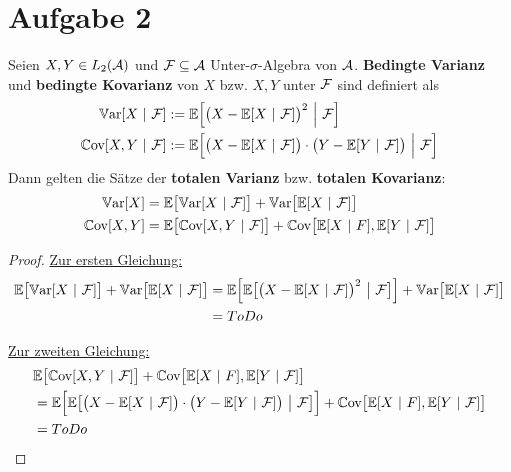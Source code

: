 \documentclass[12pt,a4paper]{article}
\begin{document}
\section*{Aufgabe 2}
Seien $X,Y\in L_2(\A)$ und $\F\subseteq\A$ Unter-$\sigma$-Algebra von $\A$. \textbf{Bedingte Varianz} und \textbf{bedingte Kovarianz} von $X$ bzw. $X,Y$ unter $\F$ sind definiert als
\begin{align*}
\Var[X~|~\F]&:=\E\Big[\big(X-\E[X~|~\F]\big)^2~\Big|~\F\Big]\\
\Cov[X,Y~|~\F]&:=\E\Big[\big(X-\E[X~|~\F]\big)\cdot\big(Y-\E[Y~|~\F]\big)~\Big|~\F\Big]
\end{align*}
Dann gelten die Sätze der \textbf{totalen Varianz} bzw. \textbf{totalen Kovarianz}:
\begin{align*}
\Var[X]&=\E\big[\Var[X~|~\F]\big]+\Var\big[\E[X~|~\F]\big]\\
\Cov[X,Y]&=\E\big[\Cov[X,Y~|~\F]\big]+\Cov\big[\E[X~|~F],\E[Y~|~\F]\big]
\end{align*}
\begin{proof}
\underline{Zur ersten Gleichung:}
\begin{align*}
\E\big[\Var[X~|~\F]\big]+\Var\big[\E[X~|~\F]\big]
&=\E\Big[\E\big[\big(X-\E[X~|~\F]\big)^2~\big|~\F\big]\Big]+\Var\big[\E[X~|~\F]\big]\\
&=ToDo
\end{align*}

\underline{Zur zweiten Gleichung:}
\begin{align*}
&\E\big[\Cov[X,Y~|~\F]\big]+\Cov\big[\E[X~|~F],\E[Y~|~\F]\big]\\
&=\E\Big[\E\big[\big(X-\E[X~|~\F]\big)\cdot\big(Y-\E[Y~|~\F]\big)~\big|~\F\big]\Big]+\Cov\big[\E[X~|~F],\E[Y~|~\F]\big]\\
&=ToDo
\end{align*}
\end{proof}
\end{document}
